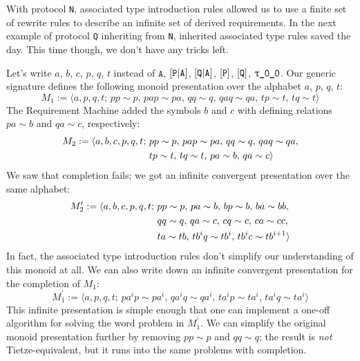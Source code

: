 \documentclass[../generics]{subfiles}
\begin{document}
\begin{example}
With protocol \texttt{N}, associated type introduction rules allowed us to use a finite set of rewrite rules to describe an infinite set of derived requirements. In the next example of protocol \texttt{Q} inheriting from \texttt{N}, inherited associated type rules saved the day. This time though, we don't have any tricks left.

\smallskip

Let's write $a$, $b$, $c$, $p$, $q$, $t$ instead of $\texttt{A}$, $[\texttt{P}|\texttt{A}]$, $[\texttt{Q}|\texttt{A}]$, $[\texttt{P}]$, $[\texttt{Q}]$, $\texttt{$\uptau$\_0\_0}$. Our generic signature defines the following monoid presentation over the alphabet $a$, $p$, $q$, $t$:
\[M_1 := \langle a,p,q,t;\,pp\sim p,\,pap\sim pa,\,qq\sim q,\, qaq\sim qa,\, tp\sim t,\, tq\sim t\rangle\]
The Requirement Machine added the symbols $b$ and $c$ with defining relations $pa\sim b$ and $qa\sim c$, respectively:
\begin{align*}
M_2 := \langle a,b,c,p,q,t;\,\hbox{}&pp\sim p,\,pap\sim pa,\,qq\sim q,\, qaq\sim qa,\\
&tp\sim t,\, tq\sim t,\,pa\sim b,\,qa\sim c\rangle
\end{align*}
We saw that completion fails; we got an infinite convergent presentation over the same alphabet:
\begin{align*}
M_2^\prime := \langle a,b,c,p,q,t;\,\hbox{}&pp\sim p,\,pa\sim b,\,bp\sim b,\,ba\sim bb,\\
&qq\sim q,\,qa\sim c,\,cq\sim c,\,ca\sim cc,\\
&ta\sim tb,\, tb^iq\sim tb^i,\,tb^ic\sim tb^{i+1}\rangle
\end{align*}
In fact, the associated type introduction rules don't simplify our understanding of this monoid at all. We can also write down an infinite convergent presentation for the completion of $M_1$:
\[M_1^\prime := \langle a,p,q,t;\,pa^ip\sim pa^i,\, qa^iq\sim qa^i,\, ta^ip\sim ta^i,\, ta^iq\sim ta^i\rangle\]
This infinite presentation is simple enough that one can implement a one-off algorithm for solving the word problem in $M_1^\prime$. We can simplify the original monoid presentation further by removing $pp\sim p$ and $qq\sim q$; the result is \emph{not} Tietze-equivalent, but it runs into the same problems with completion.


\end{example}
\end{document}
